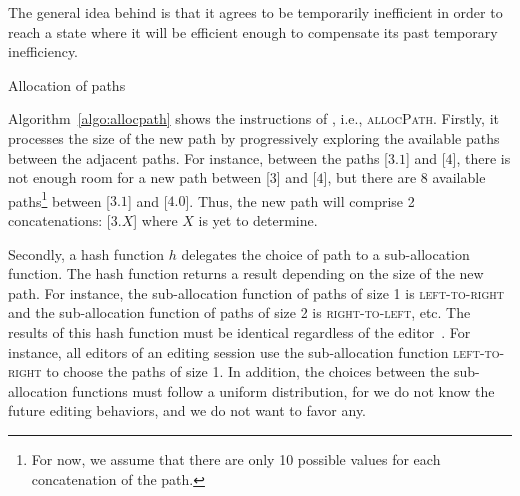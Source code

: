 \noindent The general idea behind \LSEQ is that it agrees to be temporarily
inefficient in order to reach a state where it will be efficient enough to
compensate its past temporary inefficiency.


\begin{algorithm}

\caption{\label{algo:allocpath}Allocation of paths}
\end{algorithm}

Algorithm~\ref{algo:allocpath} shows the instructions of \LSEQ, i.e.,
\textsc{allocPath}. Firstly, it processes the size of the new path by
progressively exploring the available paths between the adjacent paths. For
instance, between the paths [$3.1$] and [$4$], there is not enough room for a
new path between [$3$] and [$4$], but there are 8 available paths\footnote{For
  now, we assume that there are only 10 possible values for each concatenation
  of the path.} between [$3.1$] and [$4.0$]. Thus, the new path will comprise 2
concatenations: [$3.X$] where $X$ is yet to determine.

\noindent Secondly, a hash function $h$ delegates the choice of path to a
sub-allocation function. The hash function returns a result depending on the
size of the new path. For instance, the sub-allocation function of paths of size
1 is \textsc{left-to-right} and the sub-allocation function of paths of size 2
is \textsc{right-to-left}, etc. The results of this hash function must be
identical regardless of the editor~\cite{nedelec2013concurrency}. For instance,
all editors of an editing session use the sub-allocation function
\textsc{left-to-right} to choose the paths of size 1. In addition, the choices
between the sub-allocation functions must follow a uniform distribution, for we
do not know the future editing behaviors, and we do not want to favor any.




